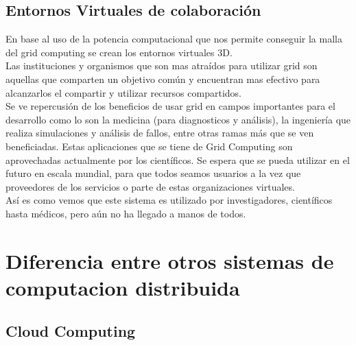 \documentclass[12pt]{article}
\begin{document}
{{\subsection{Entornos Virtuales de colaboraci\'on}
En base al uso de la potencia computacional que nos permite conseguir la malla del grid computing se crean los entornos virtuales 3D.\\
\vspace{0.2in}
Las instituciones y organismos que son mas atra\'idos para utilizar grid son aquellas que comparten un objetivo com\'un y encuentran mas efectivo para alcanzarlos el compartir y utilizar recursos compartidos.\\
Se ve repercusi\'on de los beneficios de usar grid en campos importantes para el desarrollo como lo son la medicina (para diagnosticos y an\'alisis), la ingenier\'ia que realiza simulaciones y an\'alisis de fallos, entre otras ramas m\'as que se ven beneficiadas.
Estas aplicaciones que se tiene de Grid Computing son aprovechadas actualmente por los cient\'ificos. Se espera que se pueda utilizar en el futuro en escala mundial, para que todos seamos usuarios a la vez que proveedores de los servicios o parte de estas organizaciones virtuales.\\
As\'i es como vemos que este sistema es utilizado por investigadores, cient\'ificos hasta m\'edicos, pero a\'un no ha llegado a manos de todos.\\
}


\newpage
{\raggedright
\section{Diferencia entre otros sistemas de computacion distribuida}
\subsection{Cloud Computing}
}}
\end{document}
